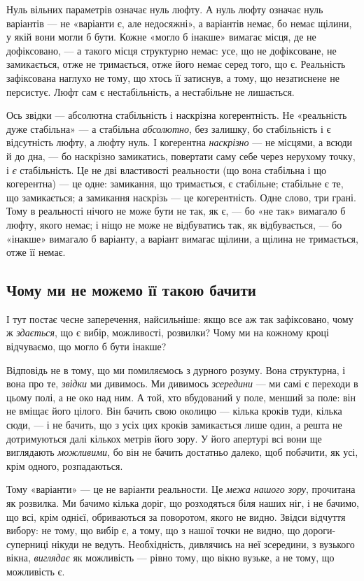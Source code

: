 \documentclass[12pt, a4paper, openany]{book}
\begin{document}
Нуль вільних параметрів означає нуль люфту. А нуль люфту означає нуль варіантів --- не «варіанти є, але недосяжні», а варіантів немає, бо немає щілини, у якій вони могли б бути. Кожне «могло б інакше» вимагає місця, де не дофіксовано, --- а такого місця структурно немає: усе, що не дофіксоване, не замикається, отже не тримається, отже його немає серед того, що є. Реальність зафіксована наглухо не тому, що хтось її затиснув, а тому, що незатиснене не персистує. Люфт сам є нестабільність, а нестабільне не лишається.

Ось звідки --- абсолютна стабільність і наскрізна когерентність. Не «реальність дуже стабільна» --- а стабільна \emph{абсолютно}, без залишку, бо стабільність і є відсутність люфту, а люфту нуль. І когерентна \emph{наскрізно} --- не місцями, а всюди й до дна, --- бо наскрізно замикатись, повертати саму себе через нерухому точку, і \emph{є} стабільність. Це не дві властивості реальности (що вона стабільна і що когерентна) --- це одне: замикання, що тримається, є стабільне; стабільне є те, що замикається; а замикання наскрізь --- це когерентність. Одне слово, три грані. Тому в реальності нічого не може бути не так, як є, --- бо «не так» вимагало б люфту, якого немає; і ніщо не може не відбуватись так, як відбувається, --- бо «інакше» вимагало б варіанту, а варіант вимагає щілини, а щілина не тримається, отже її немає.

\subsection{Чому ми не можемо її такою бачити}

І тут постає чесне заперечення, найсильніше: якщо все аж так зафіксовано, чому ж \emph{здається}, що є вибір, можливості, розвилки? Чому ми на кожному кроці відчуваємо, що могло б бути інакше?

Відповідь не в тому, що ми помиляємось з дурного розуму. Вона структурна, і вона про те, \emph{звідки} ми дивимось. Ми дивимось \emph{зсередини} --- ми самі є переходи в цьому полі, а не око над ним. А той, хто вбудований у поле, менший за поле: він не вміщає його цілого. Він бачить свою околицю --- кілька кроків туди, кілька сюди, --- і не бачить, що з усіх цих кроків замикається лише один, а решта не дотримуються далі кількох метрів його зору. У його апертурі всі вони ще виглядають \emph{можливими}, бо він не бачить достатньо далеко, щоб побачити, як усі, крім одного, розпадаються.

Тому «варіанти» --- це не варіанти реальности. Це \emph{межа нашого зору}, прочитана як розвилка. Ми бачимо кілька доріг, що розходяться біля наших ніг, і не бачимо, що всі, крім однієї, обриваються за поворотом, якого не видно. Звідси відчуття вибору: не тому, що вибір є, а тому, що з нашої точки не видно, що дороги-суперниці нікуди не ведуть. Необхідність, дивлячись на неї зсередини, з вузького вікна, \emph{виглядає} як можливість --- рівно тому, що вікно вузьке, а не тому, що можливість є.
\end{document}
